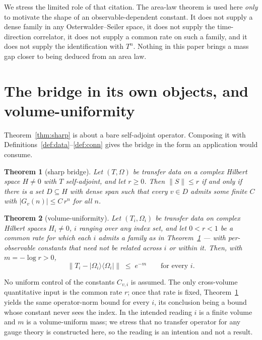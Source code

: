 \documentclass[11pt]{article}
\newtheorem{theorem}{Theorem}[section]
\theoremstyle{definition}
\newcommand{\Om}{\Omega}
\newcommand{\ket}[1]{|#1\rangle}
\newcommand{\bra}[1]{\langle #1|}
\begin{document}
We stress the limited role of that citation.  The area-law theorem is used
here \emph{only} to motivate the shape of an observable-dependent
constant.  It does not supply a dense family in any Osterwalder--Seiler
space, it does not supply the time-direction correlator, it does not
supply a common rate on such a family, and it does not supply the
identification with $T^n$.  Nothing in this paper brings a mass gap closer
to being deduced from an area law.

\section{The bridge in its own objects, and volume-uniformity}
\label{sec:vu}

Theorem~\ref{thm:sharp} is about a bare self-adjoint operator.  Composing
it with Definitions~\ref{def:data}--\ref{def:conn} gives the bridge in
the form an application would consume.

\begin{theorem}[sharp bridge]
\label{thm:sharpbridge}
Let $(T,\Om)$ be transfer data on a complex Hilbert space $H \neq 0$ with
$T$ self-adjoint, and let $r \ge 0$.  Then $\|S\| \le r$ if and only if
there is a set $D \subseteq H$ with dense span such that every $v \in D$
admits some finite $C$ with $|G_v(n)| \le C\,r^n$ for all $n$.
\end{theorem}

\begin{theorem}[volume-uniformity]
\label{thm:vu}
Let $(T_i,\Om_i)$ be transfer data on complex Hilbert spaces $H_i \neq 0$,
$i$ ranging over any index set, and let $0 < r < 1$ be a \emph{common}
rate for which each $i$ admits a family as in
Theorem~\ref{thm:sharpbridge} --- with per-observable constants that need
not be related across $i$ or within it.  Then, with $m = -\log r > 0$,
\[
  \|T_i - \ket{\Om_i}\bra{\Om_i}\| \;\le\; e^{-m}
  \qquad\text{for every } i .
\]
\end{theorem}

No uniform control of the constants $C_{v,i}$ is assumed.  The only
cross-volume quantitative input is the common rate $r$; once that rate is
fixed, Theorem~\ref{thm:sharpbridge} yields the same operator-norm bound
for every $i$, its conclusion being a bound whose constant never sees the
index.  In the intended reading $i$ is a finite volume and $m$ is a
volume-uniform mass; we stress that no transfer operator for any gauge
theory is constructed here, so the reading is an intention and not a
result.
\end{document}
